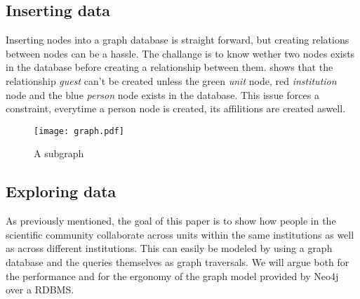 \subsection*{Inserting data}
Inserting nodes into a graph database is straight forward, but creating relations between nodes can be a hassle. The challange is to know wether two nodes exists in the database before creating a relationship between them.  shows that the relationship \textit{guest} can't be created unless the green \textit{unit} node, red \textit{institution} node and the blue \textit{person} node exists in the database. This issue forces a constraint, everytime a person node is created, its affilitions are created aswell.

\begin{figure}[h]
  \centering
  \texttt{[image: graph.pdf]}
  \caption{A subgraph}
  \label{fig:subgraph}
\end{figure}


\subsection*{Exploring data}
As previously mentioned, the goal of this paper is to show how people in the scientific community collaborate across units within the same institutions as well as across different institutions.
This can easily be modeled by using a graph database and the queries themselves as graph traversals.
We will argue both for the performance and for the ergonomy of the graph model provided by Neo4j over a RDBMS.
